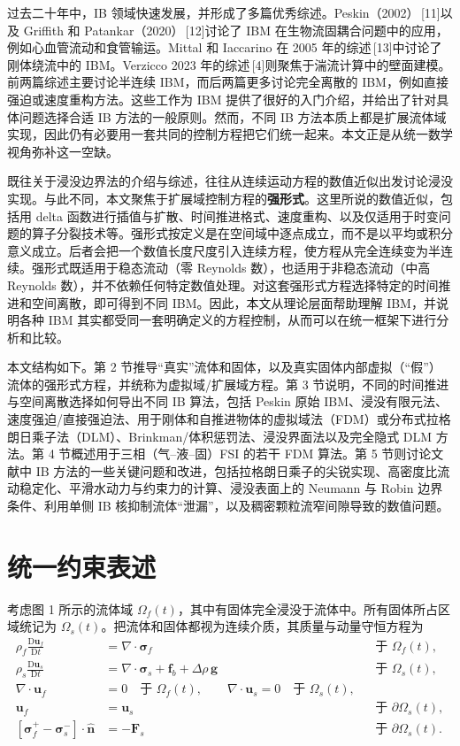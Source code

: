 \documentclass[UTF8,11pt,a4paper]{ctexart}
\newcommand{\D}{\mathrm{D}}
\begin{document}
过去二十年中，IB 领域快速发展，并形成了多篇优秀综述。Peskin（2002）\,[11]以及 Griffith 和 Patankar（2020）\,[12]讨论了 IBM 在生物流固耦合问题中的应用，例如心血管流动和食管输运。Mittal 和 Iaccarino 在 2005 年的综述\,[13]中讨论了刚体绕流中的 IBM。Verzicco 2023 年的综述\,[4]则聚焦于湍流计算中的壁面建模。前两篇综述主要讨论半连续 IBM，而后两篇更多讨论完全离散的 IBM，例如直接强迫或速度重构方法。这些工作为 IBM 提供了很好的入门介绍，并给出了针对具体问题选择合适 IB 方法的一般原则。然而，不同 IB 方法本质上都是扩展流体域实现，因此仍有必要用一套共同的控制方程把它们统一起来。本文正是从统一数学视角弥补这一空缺。

既往关于浸没边界法的介绍与综述，往往从连续运动方程的数值近似出发讨论浸没实现。与此不同，本文聚焦于扩展域控制方程的\textbf{强形式}。这里所说的数值近似，包括用 delta 函数进行插值与扩散、时间推进格式、速度重构、以及仅适用于时变问题的算子分裂技术等。强形式按定义是在空间域中逐点成立，而不是以平均或积分意义成立。后者会把一个数值长度尺度引入连续方程，使方程从完全连续变为半连续。强形式既适用于稳态流动（零 Reynolds 数），也适用于非稳态流动（中高 Reynolds 数），并不依赖任何特定数值处理。对这套强形式方程选择特定的时间推进和空间离散，即可得到不同 IBM。因此，本文从理论层面帮助理解 IBM，并说明各种 IBM 其实都受同一套明确定义的方程控制，从而可以在统一框架下进行分析和比较。

本文结构如下。第 2 节推导“真实”流体和固体，以及真实固体内部虚拟（“假”）流体的强形式方程，并统称为虚拟域/扩展域方程。第 3 节说明，不同的时间推进与空间离散选择如何导出不同 IB 算法，包括 Peskin 原始 IBM、浸没有限元法、速度强迫/直接强迫法、用于刚体和自推进物体的虚拟域法（FDM）或分布式拉格朗日乘子法（DLM）、Brinkman/体积惩罚法、浸没界面法以及完全隐式 DLM 方法。第 4 节概述用于三相（气--液--固）FSI 的若干 FDM 算法。第 5 节则讨论文献中 IB 方法的一些关键问题和改进，包括拉格朗日乘子的尖锐实现、高密度比流动稳定化、平滑水动力与约束力的计算、浸没表面上的 Neumann 与 Robin 边界条件、利用单侧 IB 核抑制流体“泄漏”，以及稠密颗粒流窄间隙导致的数值问题。

\section{统一约束表述}

考虑图 1 所示的流体域 $\Omega_f(t)$，其中有固体完全浸没于流体中。所有固体所占区域统记为 $\Omega_s(t)$。把流体和固体都视为连续介质，其质量与动量守恒方程为
\begin{align}
\rho_f\frac{\D\bm u_f}{\D t} &= \nabla\cdot\bm\sigma_f && \text{于 }\Omega_f(t), \tag{1}\\
\rho_s\frac{\D\bm u_s}{\D t} &= \nabla\cdot\bm\sigma_s+\bm f_b+\Delta\rho\,\bm g && \text{于 }\Omega_s(t), \tag{2}\\
\nabla\cdot\bm u_f &=0\quad\text{于 }\Omega_f(t),\qquad
\nabla\cdot\bm u_s=0\quad\text{于 }\Omega_s(t), \tag{3}\\
\bm u_f&=\bm u_s && \text{于 }\partial\Omega_s(t), \tag{4}\\
\left[\bm\sigma_f^{+}-\bm\sigma_s^{-}\right]\cdot\hat{\bm n}
&=-\bm F_s && \text{于 }\partial\Omega_s(t). \tag{5}
\end{align}
\end{document}
